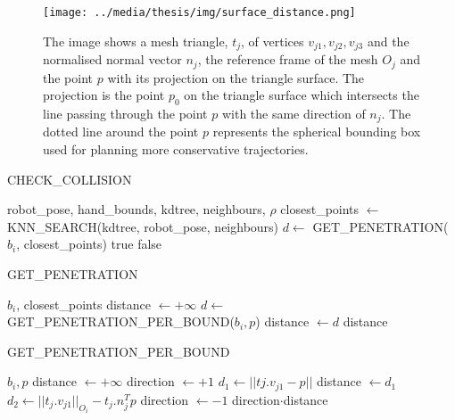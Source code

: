 \begin{figure}[!t]
\centerline{
\texttt{[image: ../media/thesis/img/surface\_distance.png]}
}
\caption[Distance from a mesh triangle and a point]{The image shows a mesh triangle, $t_j$, of vertices $v_{j1},v_{j2}, v_{j3}$ and the normalised normal vector $n_j$, the reference frame of the mesh $O_j$ and the point $p$ with its projection on the triangle surface. The projection is the point $p_0$ on the triangle surface which intersects the line passing through the point $p$ with the same direction of $n_j$. The dotted line around the point $p$ represents the spherical bounding box used for planning more conservative trajectories.}
\label{fig:surface_distance}
\end{figure}

\begin{algorithm} [t!]                   
\caption{CHECK\_COLLISION}          
\label{alg:check_collision}                           
\begin{algorithmic}                    
\REQUIRE robot\_pose, hand\_bounds, kdtree, neighbours, $\rho$
\STATE closest\_points $\gets$ KNN\_SEARCH(kdtree, robot\_pose, neighbours)
	\STATE $d \gets$ GET\_PENETRATION($b_i$, closest\_points)
		\RETURN true 
	\ENDIF
\ENDFOR
\RETURN false
\end{algorithmic}
\end{algorithm}

\begin{algorithm} [t!]                   
\caption{GET\_PENETRATION}          
\label{alg:get_penetration}                           
\begin{algorithmic}                    
\REQUIRE $b_i$, closest\_points
\STATE distance $\gets +\infty$
	\STATE $d \gets$ GET\_PENETRATION\_PER\_BOUND($b_i,p$)
		\STATE distance $\gets d$
	\ENDIF
\ENDFOR
\RETURN distance
\end{algorithmic}
\end{algorithm}

\begin{algorithm} [t!]                   
\caption{GET\_PENETRATION\_PER\_BOUND}          
\label{alg:get_penetration2}                           
\begin{algorithmic}                    
\REQUIRE $b_i,p$
\STATE distance $\gets +\infty$
\STATE direction $\gets +1$ 
	\STATE $d_1 \gets ||tj.v_{j1}-p||$
		\STATE distance $\gets d_1$
	\ENDIF
		\STATE $d_2 \gets ||t_j.v_{j1}||_{O_i} - t_j.n_j^Tp$
			\STATE direction $\gets -1$
		\ENDIF
	\ENDIF 
\ENDFOR
\RETURN direction$\cdot$distance
\end{algorithmic}
\end{algorithm}

